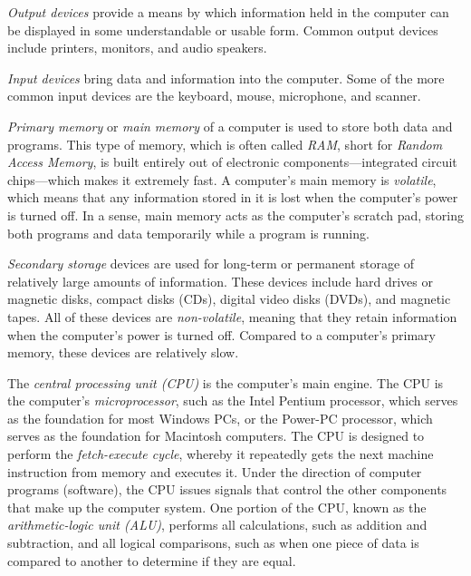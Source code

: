 \begin{BL}
\item  {\it Output devices} provide a means by which information
held in the computer can be displayed in some understandable or usable
form.  Common output devices include printers, monitors, and audio
speakers.

\vspace{5pt}\item  {\it Input devices} bring data and information into
the computer.   Some of the more common input devices are the keyboard,
mouse, microphone, and scanner.

\vspace{5pt}\item  {\it Primary memory}
or {\it main memory} of a computer is used to store both data and
programs.  This type of memory, which is often called {\em RAM}, short
for {\em Random Access Memory}, is built entirely out of electronic
components---integrated circuit chips---which makes it extremely fast.
A computer's main memory is {\it volatile}, which means that any
information stored in it is lost when the computer's power is turned
off.  In a sense, main memory acts as the computer's scratch pad,
storing both programs and data temporarily while a program is running.

\vspace{5pt}\item  {\it Secondary storage} devices are used for long-term or permanent storage of
relatively large amounts of information.  These devices include
hard drives or magnetic disks, compact disks (CDs), digital video disks
(DVDs), and magnetic tapes.  All of these devices are {\it
non-volatile}, meaning that they retain information when the computer's
power is turned off.  Compared to a computer's primary memory, these
devices are relatively slow.

\vspace{5pt}\item  The {\it central processing unit
(CPU)} is the computer's main engine.  The CPU is the
computer's {\it microprocessor}, such as the Intel Pentium processor,
which serves as the foundation for most Windows PCs, or the Power-PC
processor, which serves as the foundation for Macintosh computers.
The CPU is designed to perform the {\em fetch-execute
cycle}, whereby it repeatedly gets the
next machine instruction from memory and executes it.  Under the
direction of computer programs (software), the CPU issues signals that
control the other components that make up the computer system.  One
portion of the CPU, known as the {\it arithmetic-logic unit (ALU)},
performs all calculations, such as addition and subtraction, and all
logical comparisons, such as when one piece of data is compared to
another to determine if they are equal.
\end{BL}


